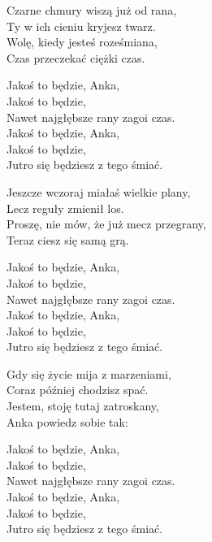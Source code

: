 \begin{text}
    Czarne chmury wiszą już od rana,\\
    Ty w ich cieniu kryjesz twarz.\\
    Wolę, kiedy jesteś roześmiana,\\
    Czas przeczekać ciężki czas.	

    \vin Jakoś to będzie, Anka,\\
    \vin Jakoś to będzie,\\
    \vin Nawet najgłębsze rany zagoi czas.	\\
    \vin Jakoś to będzie, Anka,	\\
    \vin Jakoś to będzie,\\
    \vin Jutro się będziesz z tego śmiać.	

    Jeszcze wczoraj miałaś wielkie plany,\\
    Lecz reguły zmienił los.\\
    Proszę, nie mów, że już mecz przegrany,\\
    Teraz ciesz się samą grą.

    \vin Jakoś to będzie, Anka,\\
    \vin Jakoś to będzie,\\
    \vin Nawet najgłębsze rany zagoi czas.	\\
    \vin Jakoś to będzie, Anka,	\\
    \vin Jakoś to będzie,\\
    \vin Jutro się będziesz z tego śmiać.	

    Gdy się życie mija z marzeniami,\\
    Coraz później chodzisz spać.\\
    Jestem, stoję tutaj zatroskany,\\
    Anka powiedz sobie tak:

    \vin Jakoś to będzie, Anka,\\
    \vin Jakoś to będzie,\\
    \vin Nawet najgłębsze rany zagoi czas.	\\
    \vin Jakoś to będzie, Anka,	\\
    \vin Jakoś to będzie,\\
    \vin Jutro się będziesz z tego śmiać.	


\end{text}
